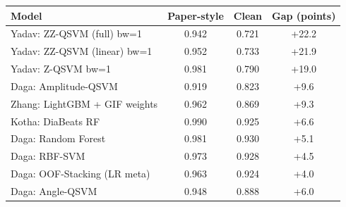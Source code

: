 \begin{tabular}{lccc}
\toprule Model & Paper-style & Clean & Gap (points)\\\midrule
Yadav: ZZ-QSVM (full) bw=1 & 0.942 & 0.721 & +22.2 \\
Yadav: ZZ-QSVM (linear) bw=1 & 0.952 & 0.733 & +21.9 \\
Yadav: Z-QSVM bw=1 & 0.981 & 0.790 & +19.0 \\
Daga: Amplitude-QSVM & 0.919 & 0.823 & +9.6 \\
Zhang: LightGBM + GIF weights & 0.962 & 0.869 & +9.3 \\
Kotha: DiaBeats RF & 0.990 & 0.925 & +6.6 \\
Daga: Random Forest & 0.981 & 0.930 & +5.1 \\
Daga: RBF-SVM & 0.973 & 0.928 & +4.5 \\
Daga: OOF-Stacking (LR meta) & 0.963 & 0.924 & +4.0 \\
Daga: Angle-QSVM & 0.948 & 0.888 & +6.0 \\

\bottomrule\end{tabular}
